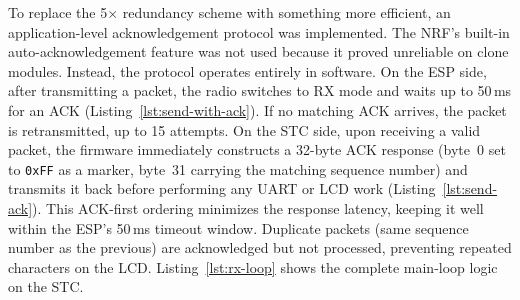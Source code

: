 \documentclass[12pt, a4paper]{article}
\begin{document}
\begin{listing}[ht]
\inputminted[firstline=76, lastline=107, fontsize=\footnotesize, frame=single, linenos]{c}{../STC89C52/main.c}
\caption{Timer~0 ISR: polls the NRF every 5\,ms and drains received packets into a ring buffer (\texttt{main.c}).}
\label{lst:timer0-isr}
\end{listing}

To replace the 5$\times$ redundancy scheme with something more efficient, an application-level acknowledgement protocol was implemented. The NRF's built-in auto-acknowledgement feature was not used because it proved unreliable on clone modules. Instead, the protocol operates entirely in software. On the ESP side, after transmitting a packet, the radio switches to RX mode and waits up to 50\,ms for an ACK (Listing~\ref{lst:send-with-ack}). If no matching ACK arrives, the packet is retransmitted, up to 15 attempts. On the STC side, upon receiving a valid packet, the firmware immediately constructs a 32-byte ACK response (byte~0 set to \texttt{0xFF} as a marker, byte~31 carrying the matching sequence number) and transmits it back before performing any UART or LCD work (Listing~\ref{lst:send-ack}). This ACK-first ordering minimizes the response latency, keeping it well within the ESP's 50\,ms timeout window. Duplicate packets (same sequence number as the previous) are acknowledged but not processed, preventing repeated characters on the LCD. Listing~\ref{lst:rx-loop} shows the complete main-loop logic on the STC.

\begin{listing}[ht]
\inputminted[firstline=43, lastline=69, fontsize=\footnotesize, frame=single, linenos]{cpp}{../esp32_firmware/keyboard_tx.cpp}
\caption{ESP ACK-based transmission: send a packet, wait for acknowledgement, and retry on timeout (\texttt{keyboard\_tx.cpp}).}
\label{lst:send-with-ack}
\end{listing}

\begin{listing}[ht]
\inputminted[firstline=119, lastline=141, fontsize=\footnotesize, frame=single, linenos]{c}{../STC89C52/main.c}
\caption{STC ACK response: builds and sends an acknowledgement packet, then returns to RX mode (\texttt{main.c}).}
\label{lst:send-ack}
\end{listing}

\begin{listing}[ht]
\inputminted[firstline=228, lastline=261, fontsize=\footnotesize, frame=single, linenos]{c}{../STC89C52/main.c}
\caption{STC main loop: dequeues packets from the ring buffer, sends ACK immediately, then processes characters for the LCD (\texttt{main.c}).}
\label{lst:rx-loop}
\end{listing}
\end{document}
